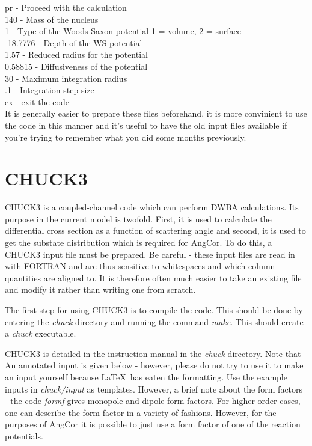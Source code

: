 \documentclass[a4paper,10pt]{article}
\begin{document}
\noindent pr - Proceed with the calculation\\
140 - Mass of the nucleus\\
1 - Type of the Woods-Saxon potential 1 = volume, 2 = surface\\
-18.7776 - Depth of the WS potential\\
1.57 - Reduced radius for the potential\\
0.58815 - Diffusiveness of the potential\\
30 - Maximum integration radius\\
.1 - Integration step size\\
ex - exit the code\\

It is generally easier to prepare these files beforehand, it is more convinient to use the code in this manner and it's useful to have the old input files available if you're trying to remember what you did some months previously.


\section{CHUCK3}

CHUCK3 is a coupled-channel code which can perform DWBA calculations. Its purpose in the current model is twofold. First, it is used to calculate the differential cross section as a function of scattering angle and second, it is used to get the substate distribution which is required for AngCor. To do this, a CHUCK3 input file must be prepared. Be careful - these input files are read in with FORTRAN and are thus sensitive to whitespaces and which column quantities are aligned to. It is therefore often much easier to take an existing file and modify it rather than writing one from scratch.

The first step for using CHUCK3 is to compile the code. This should be done by entering the {\it chuck} directory and running the command {\it make}. This should create a {\it chuck} executable.

CHUCK3 is detailed in the instruction manual in the {\it chuck} directory. Note that  An annotated input is given below - however, please do not try to use it to make an input yourself because \LaTeX\ has eaten the formatting. Use the example inputs in {\it chuck/input} as templates. However, a brief note about the form factors - the code {\it formf} gives monopole and dipole form factors. For higher-order cases, one can describe the form-factor in a variety of fashions. However, for the purposes of AngCor it is possible to just use a form factor of one of the reaction potentials.
\end{document}
